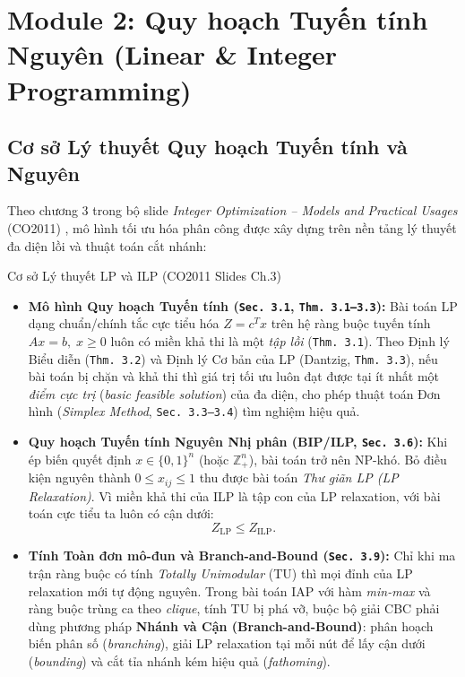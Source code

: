 \section{Module 2: Quy hoạch Tuyến tính Nguyên (Linear \& Integer Programming)}
\label{sec:m2}

\subsection{Cơ sở Lý thuyết Quy hoạch Tuyến tính và Nguyên}
Theo chương 3 trong bộ slide \textit{Integer Optimization -- Models and Practical Usages} (CO2011) \cite{slides_ilp,matousek2007,nemhauser1999}, mô hình tối ưu hóa phân công được xây dựng trên nền tảng lý thuyết đa diện lồi và thuật toán cắt nhánh:

\begin{theorybox}{Cơ sở Lý thuyết LP và ILP (CO2011 Slides Ch.3)}
\begin{itemize}
    \item \textbf{Mô hình Quy hoạch Tuyến tính (\texttt{Sec. 3.1}, \texttt{Thm. 3.1--3.3}):} Bài toán LP dạng chuẩn/chính tắc cực tiểu hóa $Z = c^T x$ trên hệ ràng buộc tuyến tính $Ax = b, \; x \ge 0$ luôn có miền khả thi là một \textit{tập lồi} (\texttt{Thm. 3.1}). Theo Định lý Biểu diễn (\texttt{Thm. 3.2}) và Định lý Cơ bản của LP (Dantzig, \texttt{Thm. 3.3}), nếu bài toán bị chặn và khả thi thì giá trị tối ưu luôn đạt được tại ít nhất một \textit{điểm cực trị} (\textit{basic feasible solution}) của đa diện, cho phép thuật toán Đơn hình (\textit{Simplex Method}, \texttt{Sec. 3.3--3.4}) tìm nghiệm hiệu quả.
    \item \textbf{Quy hoạch Tuyến tính Nguyên Nhị phân (BIP/ILP, \texttt{Sec. 3.6}):} Khi ép biến quyết định $x \in \{0,1\}^n$ (hoặc $\mathbb{Z}_+^n$), bài toán trở nên NP-khó. Bỏ điều kiện nguyên thành $0 \le x_{ij} \le 1$ thu được bài toán \textit{Thư giãn LP (LP Relaxation)}. Vì miền khả thi của ILP là tập con của LP relaxation, với bài toán cực tiểu ta luôn có cận dưới:
    \begin{equation*}
        Z_{\text{LP}} \le Z_{\text{ILP}}.
    \end{equation*}
    \item \textbf{Tính Toàn đơn mô-đun và Branch-and-Bound (\texttt{Sec. 3.9}):} Chỉ khi ma trận ràng buộc có tính \textit{Totally Unimodular} (TU) thì mọi đỉnh của LP relaxation mới tự động nguyên. Trong bài toán IAP với hàm \textit{min-max} và ràng buộc trùng ca theo \textit{clique}, tính TU bị phá vỡ, buộc bộ giải CBC phải dùng phương pháp \textbf{Nhánh và Cận (Branch-and-Bound)}: phân hoạch biến phân số (\textit{branching}), giải LP relaxation tại mỗi nút để lấy cận dưới (\textit{bounding}) và cắt tỉa nhánh kém hiệu quả (\textit{fathoming}).
\end{itemize}
\end{theorybox}

